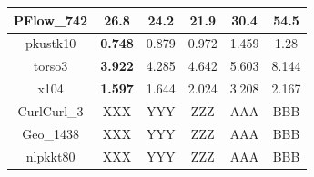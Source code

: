 \begin{table}[h!]
\begin{tabular}{|c|c|c|c|c|c|}
PFlow\_742  & 26.8                                                      & 24.2                                                       & \textbf{21.9}                                             & 30.4                                                       & 54.5                                                       \\ \hline
pkustk10    & \textbf{0.748}                                            & 0.879                                                      & 0.972                                                     & 1.459                                                      & 1.28                                                       \\ \hline
torso3      & \textbf{3.922}                                            & 4.285                                                      & 4.642                                                     & 5.603                                                      & 8.144                                                      \\ \hline
x104        & \textbf{1.597}                                            & 1.644                                                      & 2.024                                                     & 3.208                                                      & 2.167                                                      \\ \hline
CurlCurl\_3 & XXX                                                       & YYY                                                        & ZZZ                                                       & AAA                                                        & BBB                                                        \\ \hline
Geo\_1438   & XXX                                                       & YYY                                                        & ZZZ                                                       & AAA                                                        & BBB                                                        \\ \hline
nlpkkt80    & XXX                                                       & YYY                                                        & ZZZ                                                       & AAA                                                        & BBB                                                        \\ \hline
\end{tabular}
\end{table}










